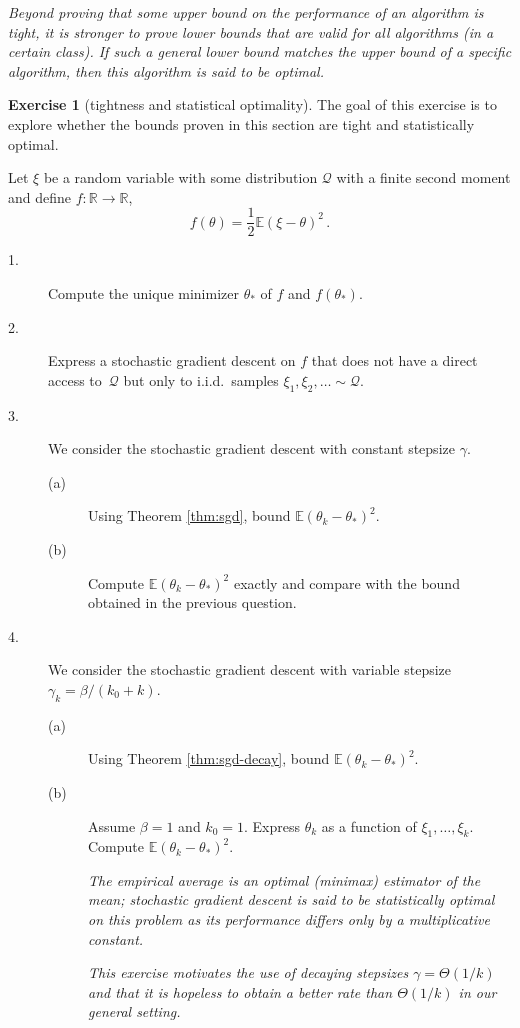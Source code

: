 \documentclass[11pt,reqno]{article}
\newcommand{\E}{\mathbb{E}}
\newcommand{\R}{\mathbb{R}}
\newcommand{\cQ}{\mathcal{Q}}
\numberwithin{equation}{section}
\theoremstyle{plain}
\theoremstyle{definition}
\newtheorem{exercice}[assumption]{Exercise}
\theoremstyle{remark}
\begin{document}
\emph{Beyond proving that some upper bound on the performance of an algorithm is tight, it is stronger to prove lower bounds that are valid for all algorithms (in a certain class). If such a general lower bound matches the upper bound of a specific algorithm, then this algorithm is said to be optimal.}

\begin{exercice}[tightness and statistical optimality]
	\label{exer:sgd-optimality}
The goal of this exercise is to explore whether the bounds proven in this section are tight and statistically optimal. 

Let $\xi$ be a random variable with some distribution $\cQ$ with a finite second moment and define $f:\R \to \R$, 
\begin{equation*}
	f(\theta) = \frac{1}{2} \E \left(\xi - \theta\right)^2 \, .
\end{equation*}
\begin{description}
	\item[1.] Compute the unique minimizer $\theta_*$ of $f$ and $f(\theta_*)$. 
	\item[2.] Express a stochastic gradient descent on $f$ that does not have a direct access to~$\cQ$ but only to i.i.d.~samples $\xi_1, \xi_2, \dots \sim \cQ$. 
	\item[3.] We consider the stochastic gradient descent with constant stepsize $\gamma$. 
	\begin{description}
		\item[(a)] Using Theorem \ref{thm:sgd}, bound $\E(\theta_k-\theta_*)^2$. 
		\item[(b)] Compute $\E(\theta_k-\theta_*)^2$ exactly and compare with the bound obtained in the previous question.
	\end{description}   
	\item[4.] We consider the stochastic gradient descent with variable stepsize $\gamma_k = \beta/(k_0+k)$.
	\begin{description}
		\item[(a)] Using Theorem \ref{thm:sgd-decay}, bound $\E(\theta_k-\theta_*)^2$.
		\item[(b)] Assume $\beta = 1$ and $k_0 = 1$. Express $\theta_k$ as a function of $\xi_1, \dots, \xi_k$. Compute $\E(\theta_k-\theta_*)^2$. 
		
		\emph{The empirical average is an optimal (minimax) estimator of the mean; stochastic gradient descent is said to be statistically optimal on this problem as its performance differs only by a multiplicative constant.}
		
		\emph{This exercise motivates the use of decaying stepsizes $\gamma = \Theta(1/k)$ and that it is hopeless to obtain a better rate than $\Theta(1/k)$ in our general setting.}
	\end{description} 
\end{description}
\end{exercice}
\end{document}
